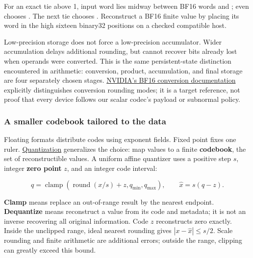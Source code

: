 For an exact tie above 1, input word  lies midway between BF16 words  and ; even chooses . The next tie  chooses . Reconstruct a BF16 finite value by placing its word in the high sixteen binary32 positions on a checked compatible host.

Low-precision storage does not force a low-precision accumulator. Wider accumulation delays additional rounding, but cannot recover bits already lost when operands were converted. This is the same persistent-state distinction encountered in arithmetic: conversion, product, accumulation, and final storage are four separately chosen stages. \href{https://docs.nvidia.com/cuda/cuda-math-api/cuda_math_api/group__CUDA__MATH____BFLOAT16__MISC.html}{NVIDIA's BF16 conversion documentation} explicitly distinguishes conversion rounding modes; it is a target reference, not proof that every device follows our scalar codec's payload or subnormal policy.

\subsubsection{A smaller codebook tailored to the data}\label{01-foundations-i-ch001-a-smaller-codebook-tailored-to-the-data}

\hypertarget{01-foundations-i-ch001-a-smaller-codebook-tailored-to-the-data}{}

Floating formats distribute codes using exponent fields. Fixed point fixes one ruler. \hyperref[appendix-d5da3eaabaef]{Quantization} generalizes the choice: map values to a finite \textbf{codebook}, the set of reconstructible values. A uniform affine quantizer uses a positive step \(s\), integer \textbf{zero point} \(z\), and an integer code interval:

\[
q=\operatorname{clamp}\!\left(\operatorname{round}(x/s)+z,q_{\min},q_{\max}\right),
\qquad
\widehat x=s(q-z).
\]

\textbf{Clamp} means replace an out-of-range result by the nearest endpoint. \textbf{Dequantize} means reconstruct a value from its code and metadata; it is not an inverse recovering all original information. Code \(z\) reconstructs zero exactly. Inside the unclipped range, ideal nearest rounding gives \(|x-\widehat x|\le s/2\). Scale rounding and finite arithmetic are additional errors; outside the range, clipping can greatly exceed this bound.

